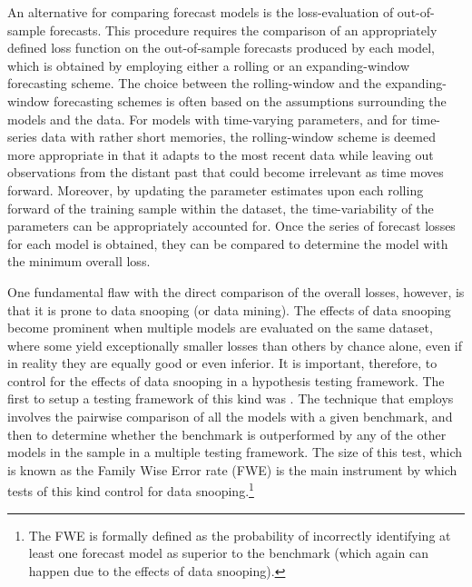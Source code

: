\documentclass{article} %
\begin{document}
	 An alternative for comparing forecast models is the loss-evaluation of out-of-sample forecasts. This procedure requires the comparison of an appropriately defined loss function on the out-of-sample forecasts produced by each model, which is obtained by employing either a rolling or an expanding-window forecasting scheme. The choice between the rolling-window and the expanding-window forecasting schemes is often based on the assumptions surrounding the models and the data. For models with time-varying parameters, and for time-series data with rather short memories, the rolling-window scheme is deemed more appropriate in that it adapts to the most recent data while leaving out observations from the distant past that could become irrelevant as time moves forward. Moreover, by updating the parameter estimates upon each rolling forward of the training sample within the dataset, the time-variability of the parameters can be appropriately accounted for. Once the series of forecast losses for each model is obtained, they can be compared to determine the model with the minimum overall loss.
	 
	 One fundamental flaw with the direct comparison of the overall losses, however, is that it is prone to data snooping (or data mining). The effects of data snooping become prominent when multiple models are evaluated on the same dataset, where some yield exceptionally smaller losses than others by chance alone, even if in reality they are equally good or even inferior. It is important, therefore, to control for the effects of data snooping in a hypothesis testing framework. The first to setup a testing framework of this kind was \textcite{WHITE-BRC}. The technique that \textcite{WHITE-BRC} employs involves the pairwise comparison of all the models with a given benchmark, and then to determine whether the benchmark is outperformed by any of the other models in the sample in a multiple testing framework. The size of this test, which is known as the Family Wise Error rate (FWE) is the main instrument by which tests of this kind control for data snooping.\footnote{The FWE is formally defined as the probability of incorrectly identifying at least one forecast model as superior to the benchmark (which again can happen due to the effects of data snooping).}
	 
\end{document}
